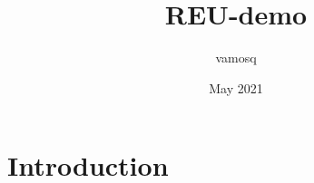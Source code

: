 \documentclass{article}
\title{REU-demo}
\author{vamosq }
\date{May 2021}
\begin{document}
\maketitle

\section{Introduction}
\end{document}
